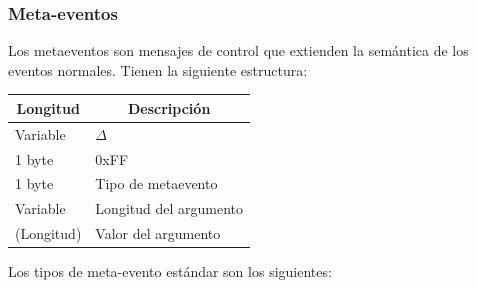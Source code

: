 \smallskip

\subsubsection{Meta-eventos}

Los metaeventos son mensajes de control que extienden la semántica de los eventos normales. Tienen la siguiente estructura:

\smallskip

\begin{center}
	\begin{tabular}{|l|l|}
		\hline \multicolumn{1}{|c|}{\textbf{Longitud}} & \multicolumn{1}{c|}{\textbf{Descripción}} \\
		\hline Variable & $\Delta$ \\ 
		\hline 1 byte & 0xFF \\
		\hline 1 byte & Tipo de metaevento \\
		\hline Variable & Longitud del argumento \\ 
		\hline (Longitud) & Valor del argumento \\ 
		\hline
	\end{tabular}
	\smallskip
\end{center}

\smallskip

Los tipos de meta-evento estándar son los siguientes:

\smallskip


